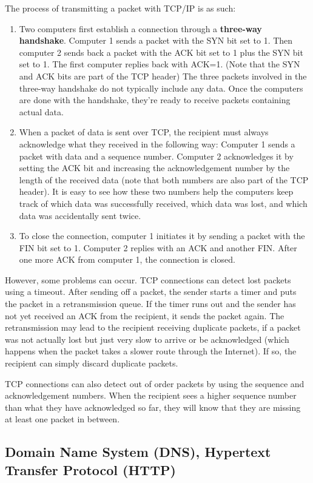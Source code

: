 \documentclass{article}
\begin{document}
  The process of transmitting a packet with TCP/IP is as such:
  \begin{enumerate}
      \item Two computers first establish a connection through a \textbf{three-way handshake}. Computer 1 sends a packet with the SYN bit set to 1. Then computer 2 sends back a packet with the ACK bit set to 1 plus the SYN bit set to 1. The first computer replies back with ACK=1. (Note that the SYN and ACK bits are part of the TCP header) The three packets involved in the three-way handshake do not typically include any data. Once the computers are done with the handshake, they're ready to receive packets containing actual data.
      \item When a packet of data is sent over TCP, the recipient must always acknowledge what they received in the following way: Computer 1 sends a packet with data and a sequence number. Computer 2 acknowledges it by setting the ACK bit and increasing the acknowledgement number by the length of the received data (note that both numbers are also part of the TCP header). It is easy to see how these two numbers help the computers keep track of which data was successfully received, which data was lost, and which data was accidentally sent twice. 
      \item To close the connection, computer 1 initiates it by sending a packet with the FIN bit set to 1. Computer 2 replies with an ACK and another FIN. After one more ACK from computer 1, the connection is closed. 
  \end{enumerate}

  However, some problems can occur. TCP connections can detect lost packets using a timeout. After sending off a packet, the sender starts a timer and puts the packet in a retransmission queue. If the timer runs out and the sender has not yet received an ACK from the recipient, it sends the packet again. The retransmission may lead to the recipient receiving duplicate packets, if a packet was not actually lost but just very slow to arrive or be acknowledged (which happens when the packet takes a slower route through the Internet). If so, the recipient can simply discard duplicate packets. 

  TCP connections can also detect out of order packets by using the sequence and acknowledgement numbers. When the recipient sees a higher sequence number than what they have acknowledged so far, they will know that they are missing at least one packet in between.

  \subsection{Domain Name System (DNS), Hypertext Transfer Protocol (HTTP)}
\end{document}
